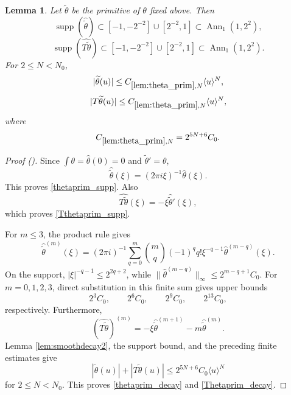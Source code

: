 \documentclass[12pt,reqno]{amsart}
\newcommand{\auto}{{({\tiny\faCar})}}
\theoremstyle{plain}
\newtheorem{lemma}[theorem]{Lemma}
\numberwithin{equation}{section}
\theoremstyle{remark}
\newcommand{\using}[1]{}
\begin{document}
\begin{lemma}\label{lem:theta_prim}\using{lem:smoothdecay2}
Let $\widetilde\theta$ be the primitive of $\theta$ fixed above. Then
\begin{equation}\label{thetaprim_supp}
\operatorname{supp}(\widehat{\widetilde\theta})
\subset[-1,-2^{-2}]\cup[2^{-2},1]
\subset\operatorname{Ann}_1(1,2^2),
\end{equation}
\begin{equation}\label{Tthetaprim_supp}
\operatorname{supp}(\widehat{T\widetilde\theta})
\subset[-1,-2^{-2}]\cup[2^{-2},1]
\subset\operatorname{Ann}_1(1,2^2).
\end{equation}
For $2\le N<N_0$,
\begin{equation}\label{thetaprim_decay}
|\widetilde\theta(u)|
\le C_{\ref{lem:theta_prim},N}\langle u\rangle^N,
\end{equation}
\begin{equation}\label{Thetaprim_decay}
|T\widetilde\theta(u)|
\le C_{\ref{lem:theta_prim},N}\langle u\rangle^N,
\end{equation}
where
\begin{equation}\label{auto:theta-primitive-constant-definition}
C_{\ref{lem:theta_prim},N}
=2^{5N+6}C_0.
\end{equation}
\end{lemma}
\begin{proof}[Proof \auto]
Since $\int\theta=\widehat\theta(0)=0$ and $\widetilde\theta'=\theta$,
\[
\widehat{\widetilde\theta}(\xi)=(2\pi i\xi)^{-1}\widehat\theta(\xi).
\]
This proves \eqref{thetaprim_supp}. Also
\[
\widehat{T\widetilde\theta}(\xi)
=-\xi\widehat{\widetilde\theta}'(\xi),
\]
which proves \eqref{Tthetaprim_supp}.

For $m\le3$, the product rule gives
\[
\widehat{\widetilde\theta}^{(m)}(\xi)
=(2\pi i)^{-1}
\sum_{q=0}^m\binom{m}{q}(-1)^q q!\xi^{-q-1}
\widehat\theta^{(m-q)}(\xi).
\]
On the support, $|\xi|^{-q-1}\le2^{2q+2}$, while
$\|\widehat\theta^{(m-q)}\|_\infty\le2^{m-q+1}C_0$. For $m=0,1,2,3$, direct substitution in this finite sum gives upper bounds
\[
2^3C_0,
\qquad
2^6C_0,
\qquad
2^9C_0,
\qquad
2^{13}C_0,
\]
respectively. Furthermore,
\[
(\widehat{T\widetilde\theta})^{(m)}
=-\xi\widehat{\widetilde\theta}^{(m+1)}
-m\widehat{\widetilde\theta}^{(m)}.
\]
Lemma \ref{lem:smoothdecay2}, the support bound, and the preceding finite estimates give
\[
|\widetilde\theta(u)|+|T\widetilde\theta(u)|
\le2^{5N+6}C_0\langle u\rangle^N
\]
for $2\le N<N_0$. This proves \eqref{thetaprim_decay} and \eqref{Thetaprim_decay}.
\end{proof}
\end{document}
